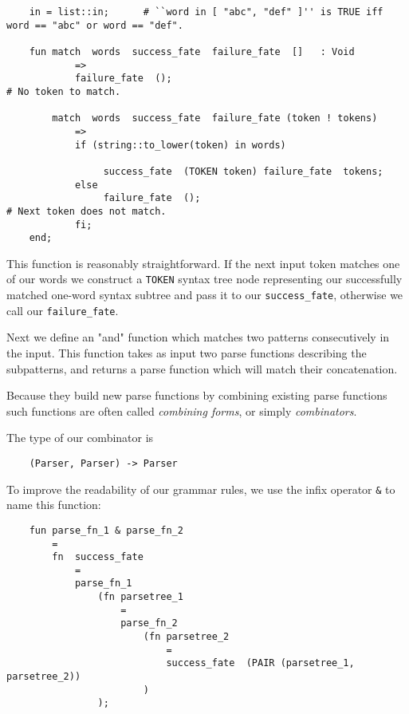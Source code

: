 \begin{verbatim}
    in = list::in;      # ``word in [ "abc", "def" ]'' is TRUE iff word == "abc" or word == "def".

    fun match  words  success_fate  failure_fate  []   : Void
            =>
            failure_fate  ();                                               # No token to match.

        match  words  success_fate  failure_fate (token ! tokens)
            =>
            if (string::to_lower(token) in words)

                 success_fate  (TOKEN token) failure_fate  tokens;
            else
                 failure_fate  ();                                          # Next token does not match.
            fi;     
    end;
\end{verbatim}

This function is reasonably straightforward.  If the next input token 
matches one of our words we construct a {\tt TOKEN} syntax tree 
node representing our successfully matched one-word syntax subtree 
and pass it to our {\tt success\_fate}, otherwise we call our 
{\tt failure\_fate}.

Next we define an "and" function which matches two patterns consecutively 
in the input.  This function takes as input two parse functions describing 
the subpatterns, and returns a parse function which will match their 
concatenation.

Because they build new parse functions by combining existing 
parse functions such 
functions are often called {\it combining forms}, or simply {\it 
combinators}.

The type of our combinator is

\begin{verbatim}
    (Parser, Parser) -> Parser 
\end{verbatim}

To improve the readability of our grammar rules, we 
use the infix operator {\tt \&} to name this function:

\begin{verbatim}
    fun parse_fn_1 & parse_fn_2
        =
        fn  success_fate
            =
            parse_fn_1
                (fn parsetree_1
                    =
                    parse_fn_2
                        (fn parsetree_2
                            =
                            success_fate  (PAIR (parsetree_1, parsetree_2))
                        )
                );
\end{verbatim}

